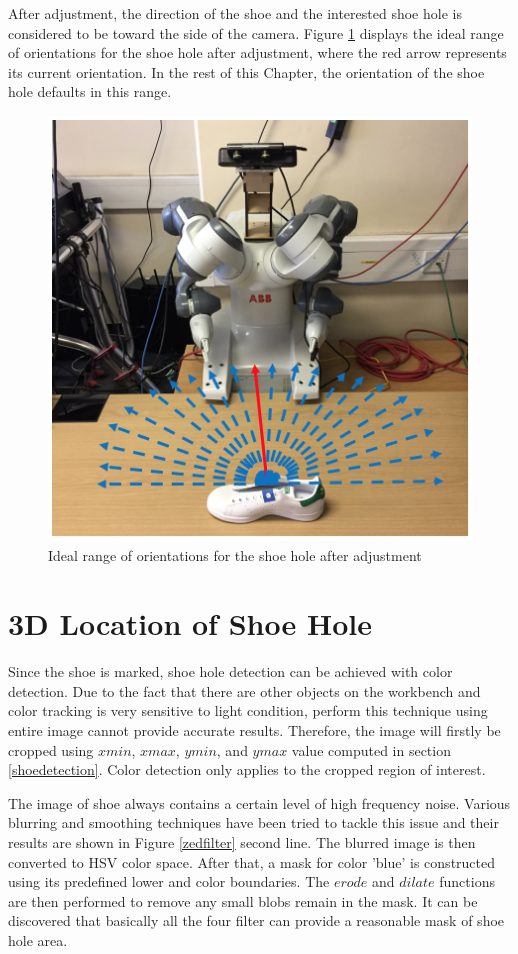 After adjustment, the direction of the shoe and the interested shoe hole is considered to be toward the side of the camera. Figure \ref{rangeshoe} displays the ideal range of orientations for the shoe hole after adjustment, where the red arrow represents its current orientation. In the rest of this Chapter, the orientation of the shoe hole defaults in this range.

\begin{figure}[H]
\centering
\includegraphics[width = 0.5\columnwidth]{Implementation/cv/rangetoward.png}
\caption{Ideal range of orientations for the shoe hole after adjustment}
\label{rangeshoe}
\end{figure}


\section{3D Location of Shoe Hole} \label{3dlocationestimation}
Since the shoe is marked, shoe hole detection can be achieved with color detection. Due to the fact that there are other objects on the workbench and color tracking is very sensitive to light condition, perform this technique using entire image cannot provide accurate results. Therefore, the image will firstly be cropped using $xmin$, $xmax$, $ymin$, and $ymax$ value computed in section \ref{shoedetection}. Color detection only applies to the cropped region of interest.

The image of shoe always contains a certain level of high frequency noise. Various blurring and smoothing techniques have been tried to tackle this issue and their results are shown in Figure \ref{zedfilter} second line. The blurred image is then converted to HSV color space. After that, a mask for color 'blue' is constructed using its predefined lower and color boundaries. The $erode$ and $dilate$ functions are then performed to remove any small blobs remain in the mask. It can be discovered that basically all the four filter can provide a reasonable mask of shoe hole area.

